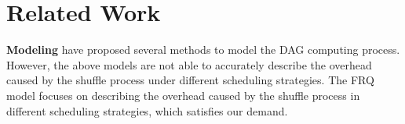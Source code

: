 \section{Related Work}

{\color{black}
\textbf{Modeling} 
\cite{khan2016hadoop, farhat2016stochastic, chen2014cresp} have proposed several methods to model the DAG computing process.
However, the above models are not able to accurately describe the overhead caused by the shuffle process under different scheduling strategies. 
The FRQ model focuses on describing the overhead caused by the shuffle process in different scheduling strategies, which satisfies our demand.

}
